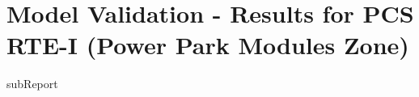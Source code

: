 


    \section{Model Validation - Results for PCS RTE-I (Power Park Modules Zone)}

    {{subReport}}
    \newpage
